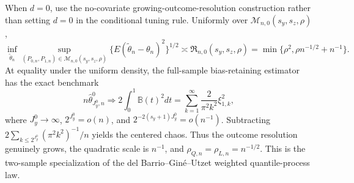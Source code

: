 When \(d=0\), use the no-covariate growing-outcome-resolution construction rather than setting \(d=0\) in the conditional tuning rule. Uniformly over \(\mathcal M_{n,0}(s_y,s_z,\rho)\),
\[
\inf_{\widetilde\theta_n}\sup_{(P_{0,n},P_{1,n})\in\mathcal M_{n,0}(s_y,s_z,\rho)}\{E(\widetilde\theta_n-\theta_n)^2\}^{1/2}\asymp\mathfrak R_{n,0}(s_y,s_z,\rho)=\min\{\rho^2,\rho n^{-1/2}+n^{-1}\}.
\]
At equality under the uniform density, the full-sample bias-retaining estimator has the exact benchmark
\[
n\widehat\theta^0_{J_y^0,n}\Rightarrow2\int_0^1\mathbb B(t)^2dt=\sum_{k=1}^{\infty}\frac{2}{\pi^2k^2}\xi_{1,k}^2,
\]
where \(J_y^0\to\infty\), \(2^{J_y^0}=o(n)\), and \(2^{-2(s_y+1)J_y^0}=o(n^{-1})\). Subtracting \(2\sum_{k\le2^{J_y^0}}(\pi^2k^2)^{-1}/n\) yields the centered chaos. Thus the outcome resolution genuinely grows, the quadratic scale is \(n^{-1}\), and \(\rho_{Q,n}=\rho_{L,n}=n^{-1/2}\). This is the two-sample specialization of the del Barrio--Gin\'e--Utzet weighted quantile-process law.